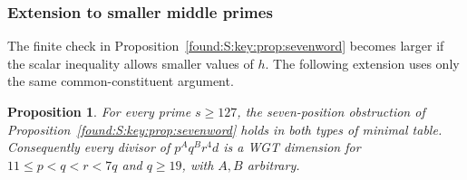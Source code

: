 \documentclass[11pt,a4paper]{article}
\numberwithin{equation}{section}
\newtheorem{proposition}[theorem]{Proposition}
\theoremstyle{remark}
\begin{document}
\subsubsection{Extension to smaller middle primes}
\label{found:S:key:sec:extended-seven}
The finite check in Proposition~\ref{found:S:key:prop:sevenword} becomes larger if
the scalar inequality allows smaller values of $h$. The following
extension uses only the same common-constituent argument.
\begin{proposition}\label{found:S:8.3}\label{found:S:key:prop:extended-seven}
For every prime $s\ge127$, the seven-position obstruction of
Proposition~\ref{found:S:key:prop:sevenword} holds in both types of minimal table.
Consequently every divisor of $p^Aq^Br^4d$ is a WGT dimension
for $11\le p<q<r<7q$ and $q\ge19$, with $A,B$ arbitrary.
\end{proposition}
\end{document}
